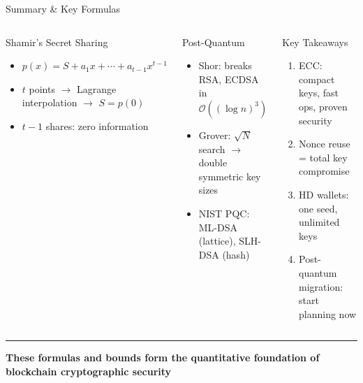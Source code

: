 \documentclass[8pt,aspectratio=169]{beamer}
\newcommand{\bottomnote}[1]{\vfill\vspace{-2mm}\textcolor{mllavender2}{\rule{\textwidth}{0.4pt}}\vspace{1mm}\footnotesize\textbf{#1}}
\begin{document}
\begin{frame}{Summary \& Key Formulas}
\begin{columns}
\begin{block}{Shamir's Secret Sharing}
\begin{itemize}
  \item $p(x) = S + a_1 x + \cdots + a_{t-1}x^{t-1}$
  \item $t$ points $\to$ Lagrange interpolation $\to$ $S = p(0)$
  \item $t\!-\!1$ shares: zero information
\end{itemize}
\end{block}
\vspace{1mm}
\begin{block}{Post-Quantum}
\scriptsize
\begin{itemize}
  \item Shor: breaks RSA, ECDSA in $\mathcal{O}((\log n)^3)$
  \item Grover: $\sqrt{N}$ search $\to$ double symmetric key sizes
  \item NIST PQC: ML-DSA (lattice), SLH-DSA (hash)
\end{itemize}
\end{block}
\vspace{1mm}
\begin{block}{Key Takeaways}
\scriptsize
\begin{enumerate}
  \item ECC: compact keys, fast ops, proven security
  \item Nonce reuse = total key compromise
  \item HD wallets: one seed, unlimited keys
  \item Post-quantum migration: start planning now
\end{enumerate}
\end{block}
\end{columns}
\bottomnote{These formulas and bounds form the quantitative foundation of blockchain cryptographic security}
\end{frame}
\end{document}
